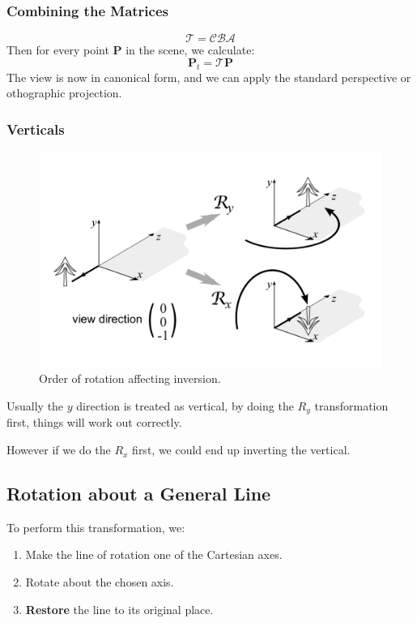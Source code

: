 \documentclass[11pt]{article}
\begin{document}
\subsubsection{Combining the Matrices}
\[
  \mathcal{T} = \mathcal{CBA}  
\]
Then for every point $\bm{P}$ in the scene, we calculate:
\[
  \bm{P}_t = \mathcal{T}\bm{P}  
\]
The view is now in canonical form, and we can apply the standard perspective or othographic projection.

\subsubsection{Verticals}
\begin{figure}[htb!]
  \caption{Order of rotation affecting inversion.}
  \includegraphics[scale=0.2]{invert}
  \centering
\end{figure}

Usually the $y$ direction is treated as vertical, by doing the $R_y$ transformation first, things will work out correctly.

However if we do the $R_x$ first, we could end up inverting the vertical.

\subsection{Rotation about a General Line}
To perform this transformation, we:
\begin{enumerate}
  \item Make the line of rotation one of the Cartesian axes.
  \item Rotate about the chosen axis.
  \item \textbf{Restore} the line to its original place.
\end{enumerate}
\end{document}

